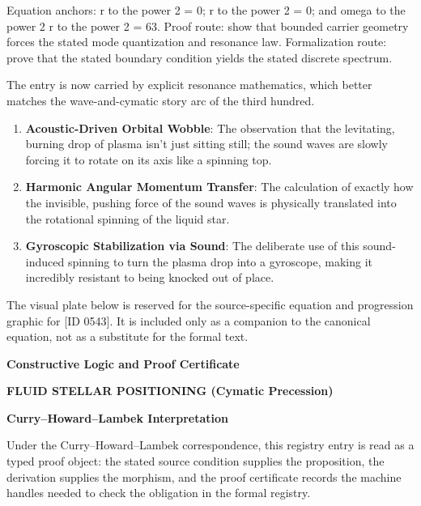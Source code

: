 Equation anchors: r to the power 2 = 0; r to the power 2 = 0; and omega to the power 2 r to the power 2 = 63. Proof route: show that bounded carrier geometry forces the stated mode quantization and resonance law. Formalization route: prove that the stated boundary condition yields the stated discrete spectrum.

The entry is now carried by explicit resonance mathematics, which better matches the wave-and-cymatic story arc of the third hundred.
\endgroup

\begin{enumerate}[leftmargin=1.6em,itemsep=6pt,topsep=4pt]
\item \textbf{Acoustic-Driven Orbital Wobble}: The observation that the levitating, burning drop of plasma isn't just sitting still; the sound waves are slowly forcing it to rotate on its axis like a spinning top.
\item \textbf{Harmonic Angular Momentum Transfer}: The calculation of exactly how the invisible, pushing force of the sound waves is physically translated into the rotational spinning of the liquid star.
\item \textbf{Gyroscopic Stabilization via Sound}: The deliberate use of this sound-induced spinning to turn the plasma drop into a gyroscope, making it incredibly resistant to being knocked out of place.
\end{enumerate}

\begingroup\footnotesize\sloppy
The visual plate below is reserved for the source-specific equation and progression graphic for [ID 0543]. It is included only as a companion to the canonical equation, not as a substitute for the formal text.
\par\endgroup
\ifTZPDarkEdition
{}
\fi

\clearpage
\begingroup\tzpsupportsetup
\noindent\textbf{\fontsize{10.8pt}{12.8pt}\selectfont [ID 0543] Constructive Logic and Proof Certificate}\par
\noindent\textbf{\fontsize{10pt}{12pt}\selectfont FLUID STELLAR POSITIONING (Cymatic Precession)}\par
\vspace{0.45em}
\begingroup
\footnotesize
\setlength{\parskip}{0.22em}
\setlength{\parindent}{0pt}
\noindent\textbf{Curry--Howard--Lambek Interpretation}\par
Under the Curry--Howard--Lambek correspondence, this registry entry is read as a typed proof
object: the stated source condition supplies the proposition, the derivation supplies the
morphism, and the proof certificate records the machine handles needed to check the obligation
in the formal registry.

